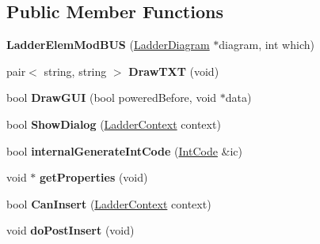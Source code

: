 \subsection*{Public Member Functions}
\begin{DoxyCompactItemize}
\item 
\hypertarget{class_ladder_elem_mod_b_u_s_ad4f08a6913efe55e6010d008a62bc289}{{\bfseries Ladder\-Elem\-Mod\-B\-U\-S} (\hyperlink{class_ladder_diagram}{Ladder\-Diagram} $\ast$diagram, int which)}\label{class_ladder_elem_mod_b_u_s_ad4f08a6913efe55e6010d008a62bc289}

\item 
\hypertarget{class_ladder_elem_mod_b_u_s_a5531942682b2163150dcde3bdfab297a}{pair$<$ string, string $>$ {\bfseries Draw\-T\-X\-T} (void)}\label{class_ladder_elem_mod_b_u_s_a5531942682b2163150dcde3bdfab297a}

\item 
\hypertarget{class_ladder_elem_mod_b_u_s_a4d5e8f4a14d08a5291642733da0a92fe}{bool {\bfseries Draw\-G\-U\-I} (bool powered\-Before, void $\ast$data)}\label{class_ladder_elem_mod_b_u_s_a4d5e8f4a14d08a5291642733da0a92fe}

\item 
\hypertarget{class_ladder_elem_mod_b_u_s_adb3745a6605a0d5c2851e3436e611741}{bool {\bfseries Show\-Dialog} (\hyperlink{struct_ladder_context}{Ladder\-Context} context)}\label{class_ladder_elem_mod_b_u_s_adb3745a6605a0d5c2851e3436e611741}

\item 
\hypertarget{class_ladder_elem_mod_b_u_s_af4727e8fe6e854d283a8cd35eec4d80a}{bool {\bfseries internal\-Generate\-Int\-Code} (\hyperlink{class_int_code}{Int\-Code} \&ic)}\label{class_ladder_elem_mod_b_u_s_af4727e8fe6e854d283a8cd35eec4d80a}

\item 
\hypertarget{class_ladder_elem_mod_b_u_s_a22f91b352cb5d2d9b760efed071cc9e8}{void $\ast$ {\bfseries get\-Properties} (void)}\label{class_ladder_elem_mod_b_u_s_a22f91b352cb5d2d9b760efed071cc9e8}

\item 
\hypertarget{class_ladder_elem_mod_b_u_s_ac0a9b9ae02def30158c77345682c2752}{bool {\bfseries Can\-Insert} (\hyperlink{struct_ladder_context}{Ladder\-Context} context)}\label{class_ladder_elem_mod_b_u_s_ac0a9b9ae02def30158c77345682c2752}

\item 
\hypertarget{class_ladder_elem_mod_b_u_s_a5da1d1baa3fa1bd58a8b006fb5841038}{void {\bfseries do\-Post\-Insert} (void)}\label{class_ladder_elem_mod_b_u_s_a5da1d1baa3fa1bd58a8b006fb5841038}


\end{DoxyCompactItemize}
